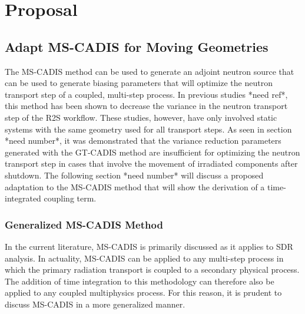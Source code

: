 \chapter{Proposal}\label{ch:proposal}

\section{Adapt MS-CADIS for Moving Geometries}\label{sec:adapt}
The MS-CADIS method can be used to generate an adjoint neutron source 
that can be used to generate biasing parameters that will optimize the neutron transport step of a coupled,
multi-step process. In previous studies *need ref*, this method has been shown to decrease
the variance in the neutron transport step of the R2S workflow.  These studies,
however, have only involved static systems with the same geometry used for all
transport steps.  
As seen in section *need number*, it was demonstrated that the variance
reduction parameters generated with the GT-CADIS method are insufficient for
optimizing the neutron transport step in cases that involve the movement 
of irradiated components after shutdown.  
The following section *need number* will discuss a proposed adaptation to the
MS-CADIS method that will show the derivation of a time-integrated coupling
term.

\subsection{Generalized MS-CADIS Method}
In the current literature, MS-CADIS is primarily discussed as it applies to SDR
analysis.  In actuality, MS-CADIS can be applied to any multi-step process in
which the primary radiation transport is coupled to a secondary physical process.
The addition of time integration to this methodology can therefore also be applied to
any coupled multiphysics process. For this reason, it is prudent to discuss
MS-CADIS in a more generalized manner.

